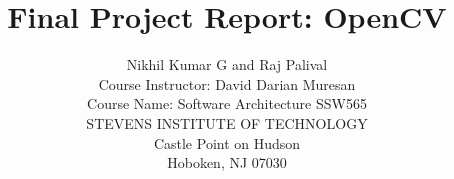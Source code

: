 %

\begin{figure}[H]
            \centering
\end{figure}
\begin{titlepage}
        \title{ Final Project Report: OpenCV }
        
        \author{Nikhil Kumar G and Raj Palival \\ Course Instructor: David Darian Muresan \\ Course Name: Software Architecture SSW565  \\
        \MakeUppercase {Stevens Institute of Technology}\\
        Castle Point on Hudson \\
        Hoboken, NJ 07030 }
         \maketitle
\end{titlepage}

\makecopyright

\begin{abstract}
\end{abstract}


% 


\contentspage

\tablelistpage

\figurelistpage

